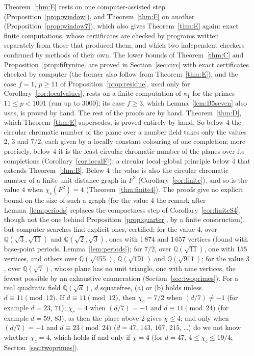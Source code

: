 \documentclass[11pt,a4paper]{amsart}
\theoremstyle{remark}
\newcommand{\Q}{\mathbb{Q}}
\begin{document}
Theorem~\ref{thm:E} rests on one computer-assisted step (Proposition~\ref{prop:window}), and Theorem~\ref{thm:F}
on another (Proposition~\ref{prop:window7}), which also gives Theorem~\ref{thm:E} again: exact finite computations,
whose certificates are checked by programs written separately from those that produced them, and which two
independent checkers confirmed by methods of their own. The lower bounds of Theorem~\ref{thm:C} and
Proposition~\ref{prop:fiftynine} are proved in Section~\ref{sec:circ} with exact certificates checked by computer (the
former also follow from Theorem~\ref{thm:E}), and the case $f=1$, $p\ge11$ of Proposition~\ref{prop:residue}, used
only for Corollary~\ref{cor:localvalues}, rests on a finite computation of $\kappa_1$ for the primes $11\le p<1001$ (run
up to $3000$); its case $f\ge3$, which Lemma~\ref{lem:B5seven} also uses, is proved by hand. The rest of the proofs
are by hand. Theorem~\ref{thm:D}, which
Theorem~\ref{thm:E} supersedes, is proved entirely by hand. So below $4$ the circular chromatic number of the plane
over a number field takes only the values $2$, $3$ and $7/2$, each given by a locally constant colouring of one
completion; more precisely, below $4$ it is the least circular chromatic number of the planes over its completions
(Corollary~\ref{cor:localF}): a circular local--global principle below $4$ that extends Theorem~\ref{thm:B}. Below
$4$ the value is also the circular chromatic number of a finite unit-distance graph in $F^2$
(Corollary~\ref{cor:finite}), and so is the value $4$ when $\chi_c(F^2)=4$ (Theorem~\ref{thm:finite4}). The proofs give
no explicit bound on the size of such a graph (for the value $4$ the remark after Lemma~\ref{lem:periods} replaces
the compactness step of Corollary~\ref{cor:finiteS4}, though not the one behind Proposition~\ref{prop:quarter}, by a
finite construction), but computer searches find explicit ones, certified: for the value $4$, over
$\Q(\sqrt3,\sqrt{11})$ and $\Q(\sqrt2,\sqrt3)$, ones with $1\,874$ and $1\,657$ vertices (found with base-point
periods, Lemma~\ref{lem:periods}); for
$7/2$, over $\Q(\sqrt{11})$, one with $155$ vertices, and others over $\Q(\sqrt{455})$, $\Q(\sqrt{191})$ and
$\Q(\sqrt{911})$;
for the value $3$, over $\Q(\sqrt7)$, whose plane has no unit triangle, one with nine vertices, the fewest possible
by an exhaustive enumeration (Section~\ref{sec:twoprimes}). For a
real quadratic field $\Q(\sqrt d)$, $d$ squarefree, (a) or (b) holds unless $d\equiv11\pmod{12}$. If
$d\equiv11\pmod{12}$, then $\chi_c=7/2$ when $(d/7)\ne-1$ (for example $d=23$, $71$); $\chi_c=4$ when $(d/7)=-1$ and
$d\equiv11\pmod{24}$ (for example $d=59$, $83$), as then the place above $2$ gives $\chi\le4$; and only when
$(d/7)=-1$ and $d\equiv23\pmod{24}$ ($d=47$, $143$, $167$, $215$, \dots) do we not know whether $\chi_c=4$, which holds
if and only if $\chi=4$ (for $d=47$, $4\le\chi_c\le19/4$; Section~\ref{sec:twoprimes}).
\end{document}
